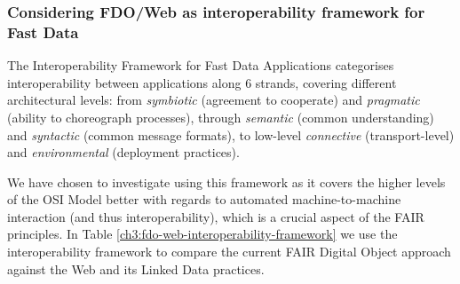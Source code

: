 \subsubsection{Considering FDO/Web as interoperability framework for Fast Data}\label{ch3:interoperability-compare}


The Interoperability Framework for Fast Data Applications \cite{delgadoInteroperabilityFrameworkDistributed2016a} categorises interoperability between applications along 6 strands, covering different architectural levels: from \emph{symbiotic} (agreement to cooperate) and \emph{pragmatic} (ability to choreograph processes), through \emph{semantic} (common understanding) and \emph{syntactic} (common message formats), to low-level \emph{connective} (transport-level) and \emph{environmental} (deployment practices).

We have chosen to investigate using this framework as it covers the higher levels of the OSI Model \cite{stallingsHandbookComputercommunicationsStandards1990} better with regards to automated machine-to-machine interaction (and thus interoperability), which is a crucial aspect of the FAIR principles. In Table \ref{ch3:fdo-web-interoperability-framework} we use the interoperability framework to compare the current FAIR Digital Object approach against the Web and its Linked Data practices.

